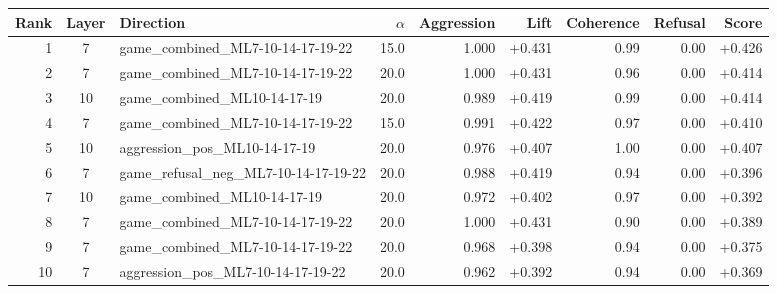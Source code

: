 \begin{tabular}{rclrrrrrr}
\toprule
Rank & Layer & Direction & $\alpha$ & Aggression & Lift & Coherence & Refusal & Score \\
\midrule
1 & 7 & game_combined_ML7-10-14-17-19-22 & 15.0 & 1.000 & +0.431 & 0.99 & 0.00 & +0.426 \\
2 & 7 & game_combined_ML7-10-14-17-19-22 & 20.0 & 1.000 & +0.431 & 0.96 & 0.00 & +0.414 \\
3 & 10 & game_combined_ML10-14-17-19 & 20.0 & 0.989 & +0.419 & 0.99 & 0.00 & +0.414 \\
4 & 7 & game_combined_ML7-10-14-17-19-22 & 15.0 & 0.991 & +0.422 & 0.97 & 0.00 & +0.410 \\
5 & 10 & aggression_pos_ML10-14-17-19 & 20.0 & 0.976 & +0.407 & 1.00 & 0.00 & +0.407 \\
6 & 7 & game_refusal_neg_ML7-10-14-17-19-22 & 20.0 & 0.988 & +0.419 & 0.94 & 0.00 & +0.396 \\
7 & 10 & game_combined_ML10-14-17-19 & 20.0 & 0.972 & +0.402 & 0.97 & 0.00 & +0.392 \\
8 & 7 & game_combined_ML7-10-14-17-19-22 & 20.0 & 1.000 & +0.431 & 0.90 & 0.00 & +0.389 \\
9 & 7 & game_combined_ML7-10-14-17-19-22 & 20.0 & 0.968 & +0.398 & 0.94 & 0.00 & +0.375 \\
10 & 7 & aggression_pos_ML7-10-14-17-19-22 & 20.0 & 0.962 & +0.392 & 0.94 & 0.00 & +0.369 \\
\bottomrule
\end{tabular}
